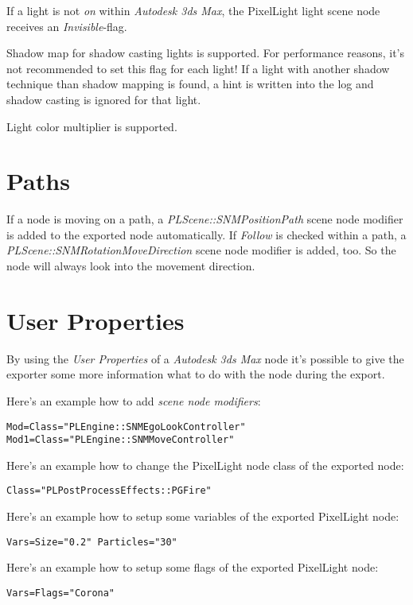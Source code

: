If a light is not \emph{on} within \emph{Autodesk 3ds Max}, the PixelLight light scene node receives an \emph{Invisible}-flag.

Shadow map for shadow casting lights is supported. For performance reasons, it's not recommended to set this flag for each light! If a light with another shadow technique than shadow mapping is found, a hint is written into the log and shadow casting is ignored for that light.

Light color multiplier is supported.




\section{Paths}
If a node is moving on a path, a \emph{PLScene::SNMPositionPath} scene node modifier is added to the exported node automatically. If \emph{Follow} is checked within a path, a \emph{PLScene::SNMRotationMoveDirection} scene node modifier is added, too. So the node will always look into the movement direction.





\section{User Properties}
By using the \emph{User Properties} of a \emph{Autodesk 3ds Max} node it's possible to give the exporter some more information what to do with the node during the export.

Here's an example how to add \emph{scene node modifiers}:

\begin{lstlisting}[caption=Multiple scene node modifiers]
Mod=Class="PLEngine::SNMEgoLookController"
Mod1=Class="PLEngine::SNMMoveController"
\end{lstlisting}

Here's an example how to change the PixelLight node class of the exported node:

\begin{lstlisting}[caption=Setting the scene node class]
Class="PLPostProcessEffects::PGFire"
\end{lstlisting}

Here's an example how to setup some variables of the exported PixelLight node:

\begin{lstlisting}[caption=Setting scene node variables]
Vars=Size="0.2" Particles="30"
\end{lstlisting}

Here's an example how to setup some flags of the exported PixelLight node:

\begin{lstlisting}[caption=Setting scene node flags]
Vars=Flags="Corona"
\end{lstlisting}
